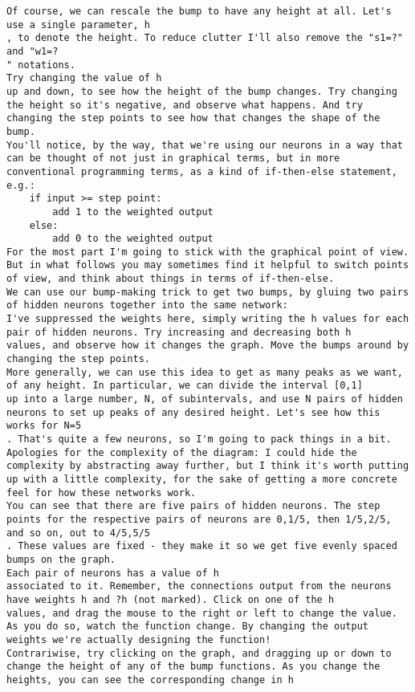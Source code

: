 \begin{lstlisting}
Of course, we can rescale the bump to have any height at all. Let's use a single parameter, h
, to denote the height. To reduce clutter I'll also remove the "s1=?" and "w1=?
" notations.
Try changing the value of h
up and down, to see how the height of the bump changes. Try changing the height so it's negative, and observe what happens. And try changing the step points to see how that changes the shape of the bump.
You'll notice, by the way, that we're using our neurons in a way that can be thought of not just in graphical terms, but in more conventional programming terms, as a kind of if-then-else statement, e.g.:
    if input >= step point:
        add 1 to the weighted output
    else:
        add 0 to the weighted output
For the most part I'm going to stick with the graphical point of view. But in what follows you may sometimes find it helpful to switch points of view, and think about things in terms of if-then-else.
We can use our bump-making trick to get two bumps, by gluing two pairs of hidden neurons together into the same network:
I've suppressed the weights here, simply writing the h values for each pair of hidden neurons. Try increasing and decreasing both h
values, and observe how it changes the graph. Move the bumps around by changing the step points.
More generally, we can use this idea to get as many peaks as we want, of any height. In particular, we can divide the interval [0,1]
up into a large number, N, of subintervals, and use N pairs of hidden neurons to set up peaks of any desired height. Let's see how this works for N=5
. That's quite a few neurons, so I'm going to pack things in a bit. Apologies for the complexity of the diagram: I could hide the complexity by abstracting away further, but I think it's worth putting up with a little complexity, for the sake of getting a more concrete feel for how these networks work.
You can see that there are five pairs of hidden neurons. The step points for the respective pairs of neurons are 0,1/5, then 1/5,2/5, and so on, out to 4/5,5/5
. These values are fixed - they make it so we get five evenly spaced bumps on the graph.
Each pair of neurons has a value of h
associated to it. Remember, the connections output from the neurons have weights h and ?h (not marked). Click on one of the h
values, and drag the mouse to the right or left to change the value. As you do so, watch the function change. By changing the output weights we're actually designing the function!
Contrariwise, try clicking on the graph, and dragging up or down to change the height of any of the bump functions. As you change the heights, you can see the corresponding change in h

\end{lstlisting}
